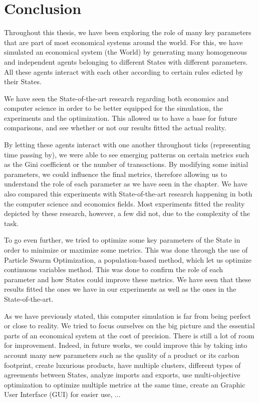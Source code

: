 \chapter{Conclusion}

Throughout this thesis, we have been exploring the role of many key parameters that are part of most economical systems around the world. For this, we have simulated an economical system (the World) by generating many homogeneous and independent agents belonging to different States with different parameters. All these agents interact with each other according to certain rules edicted by their States. 

We have seen the State-of-the-art research regarding both economics and computer science in order to be better equipped for the simulation, the experiments and the optimization. This allowed us to have a base for future comparisons, and see whether or not our results fitted the actual reality.

By letting these agents interact with one another throughout ticks (representing time passing by), we were able to see emerging patterns on certain metrics such as the Gini coefficient or the number of transactions. By modifying some initial parameters, we could influence the final metrics, therefore allowing us to understand the role of each parameter as we have seen in the  chapter. We have also compared this experiments with State-of-the-art research happening in both the computer science and economics fields. Most experiments fitted the reality depicted by these research, however, a few did not, due to the complexity of the task.

To go even further, we tried to optimize some key parameters of the State in order to minimize or maximize some metrics. This was done through the use of Particle Swarm Optimization, a population-based method, which let us optimize continuous variables method. This was done to confirm the role of each parameter and how States could improve these metrics. We have seen that these results fitted the ones we have in our experiments as well as the ones in the State-of-the-art.

As we have previously stated, this computer simulation is far from being perfect or close to reality. We tried to focus ourselves on the big picture and the essential parts of an economical system at the cost of precision. There is still a lot of room for improvement. Indeed, in future works, we could improve this by taking into account many new parameters such as the quality of a product or its carbon footprint,  create luxurious products, have multiple clusters, different types of agreements between States, analyze imports and exports, use multi-objective optimization to optimize multiple metrics at the same time, create an Graphic User Interface (GUI) for easier use, ...